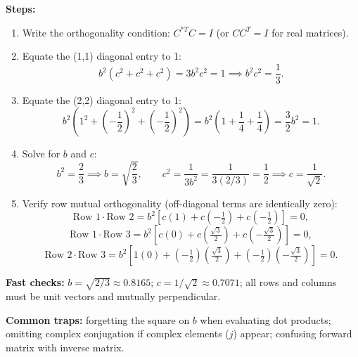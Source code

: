 \textbf{Steps:}
\begin{enumerate}
  \item Write the orthogonality condition: \(C^{*T} C = I\) (or \(C C^T = I\) for real matrices).
  \item Equate the (1,1) diagonal entry to 1:
  \[
  b^2 (c^2 + c^2 + c^2) = 3 b^2 c^2 = 1 \implies b^2 c^2 = \frac{1}{3}.
  \]
  \item Equate the (2,2) diagonal entry to 1:
  \[
  b^2 \left(1^2 + \left(-\frac{1}{2}\right)^2 + \left(-\frac{1}{2}\right)^2\right) = b^2 \left(1 + \frac{1}{4} + \frac{1}{4}\right) = \frac{3}{2} b^2 = 1.
  \]
  \item Solve for \(b\) and \(c\):
  \[
  b^2 = \frac{2}{3} \implies b = \sqrt{\frac{2}{3}},
  \qquad
  c^2 = \frac{1}{3 b^2} = \frac{1}{3(2/3)} = \frac{1}{2} \implies c = \frac{1}{\sqrt{2}}.
  \]
  \item Verify row mutual orthogonality (off-diagonal terms are identically zero):
  \[
  \text{Row 1}\cdot\text{Row 2} = b^2 \left[c(1) + c\left(-\tfrac{1}{2}\right) + c\left(-\tfrac{1}{2}\right)\right] = 0,
  \]
  \[
  \text{Row 1}\cdot\text{Row 3} = b^2 \left[c(0) + c\left(\tfrac{\sqrt{3}}{2}\right) + c\left(-\tfrac{\sqrt{3}}{2}\right)\right] = 0,
  \]
  \[
  \text{Row 2}\cdot\text{Row 3} = b^2 \left[1(0) + \left(-\tfrac{1}{2}\right)\left(\tfrac{\sqrt{3}}{2}\right) + \left(-\tfrac{1}{2}\right)\left(-\tfrac{\sqrt{3}}{2}\right)\right] = 0.
  \]
\end{enumerate}

\textbf{Fast checks:} \(b = \sqrt{2/3} \approx 0.8165\); \(c = 1/\sqrt{2} \approx 0.7071\); all rows and columns must be unit vectors and mutually perpendicular.

\textbf{Common traps:} forgetting the square on \(b\) when evaluating dot products; omitting complex conjugation if complex elements (\(j\)) appear; confusing forward matrix with inverse matrix.
